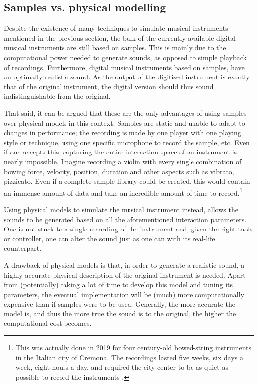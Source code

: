 \subsection{Samples vs. physical modelling}
Despite the existence of many techniques to simulate musical instruments mentioned in the previous section, the bulk of the currently available digital musical instruments are still based on samples. This is mainly due to the computational power needed to generate sounds, as opposed to simple playback of recordings. Furthermore, digital musical instruments based on samples, have an optimally realistic sound. As the output of the digitised instrument is exactly that of the original instrument, the digital version should thus sound indistinguishable from the original.

That said, it can be argued that these are the only advantages of using samples over physical models in this context. Samples are static and unable to adapt to changes in performance; the recording is made by one player with one playing style or technique, using one specific microphone to record the sample, etc. Even if one accepts this, capturing the entire interaction space of an instrument is nearly impossible. Imagine recording a violin with every single combination of bowing force, velocity, position, duration and other aspects such as vibrato, pizzicato. Even if a complete sample library could be created, this would contain an immense amount of data and take an incredible amount of time to record.\footnote{This was actually done in 2019 for four century-old bowed-string instruments in the Italian city of Cremona. The recordings lasted five weeks, six days a week, eight hours a day, and required the city center to be as quiet as possible to record the instruments \cite{nytimes, npr}.} 

Using physical models to simulate the musical instrument instead, allows the sounds to be generated based on all the aforementioned interaction parameters. One is not stuck to a single recording of the instrument and, given the right tools or controller, one can alter the sound just as one can with its real-life counterpart.

A drawback of physical models is that, in order to generate a realistic sound, a highly accurate physical description of the original instrument is needed. Apart from (potentially) taking a lot of time to develop this model and tuning its parameters, the eventual implementation will be (much) more computationally expensive than if samples were to be used. Generally, the more accurate the model is, and thus the more true the sound is to the original, the higher the computational cost becomes. 

